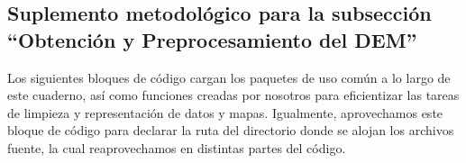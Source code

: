 \documentclass[spanish]{article}
\begin{document}
\beginsupplement

\hypertarget{suplemento-metodoluxf3gico-para-la-subsecciuxf3n-obtenciuxf3n-y-preprocesamiento-del-dem}{%
\subsection*{Suplemento metodológico para la subsección ``Obtención y
Preprocesamiento del
DEM''}\label{suplemento-metodoluxf3gico-para-la-subsecciuxf3n-obtenciuxf3n-y-preprocesamiento-del-dem}}

Los siguientes bloques de código cargan los paquetes de uso común a lo
largo de este cuaderno, así como funciones creadas por nosotros para
eficientizar las tareas de limpieza y representación de datos y mapas.
Igualmente, aprovechamos este bloque de código para declarar la ruta del
directorio donde se alojan los archivos fuente, la cual reaprovechamos
en distintas partes del código.
\end{document}
